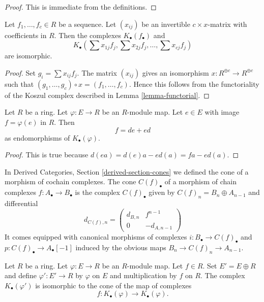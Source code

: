 \begin{proof}
This is immediate from the definitions.
\end{proof}

\begin{lemma}
\label{lemma-change-basis}
Let $f_1, \ldots, f_c \in R$ be a sequence.
Let $(x_{ij})$ be an invertible $c \times x$-matrix with
coefficients in $R$. Then the complexes
$K_\bullet(f_\bullet)$ and
$$
K_\bullet(\sum x_{1j}f_j, \sum x_{2j}f_j, \ldots, \sum x_{cj}f_j)
$$
are isomorphic.
\end{lemma}

\begin{proof}
Set $g_i = \sum x_{ij}f_j$.
The matrix $(x_{ij})$ gives an isomorphism $x : R^{\oplus c} \to R^{\oplus c}$
such that $(g_1, \ldots, g_c) \circ x = (f_1, \ldots, f_c)$.
Hence this follows from the functoriality of the Koszul complex
described in
Lemma \ref{lemma-functorial}.
\end{proof}

\begin{lemma}
\label{lemma-homotopy-koszul-abstract}
Let $R$ be a ring. Let $\varphi : E \to R$ be an $R$-module map.
Let $e \in E$ with image $f = \varphi(e)$ in $R$. Then
$$
f = de + ed
$$
as endomorphisms of $K_\bullet(\varphi)$.
\end{lemma}

\begin{proof}
This is true because $d(ea) = d(e)a - ed(a) = fa - ed(a)$.
\end{proof}

\noindent
In
Derived Categories, Section \ref{derived-section-cones}
we defined the cone of a morphism of cochain complexes.
The cone $C(f)_\bullet$ of a morphism of chain complexes
$f : A_\bullet \to B_\bullet$ is the complex $C(f)_\bullet$ given by
$C(f)_n = B_n \oplus A_{n - 1}$ and differential
\begin{equation}
\label{equation-differential-cone}
d_{C(f), n} =
\left(
\begin{matrix}
d_{B, n} & f^{n - 1} \\
0 & -d_{A, n - 1}
\end{matrix}
\right)
\end{equation}
It comes equipped with canonical morphisms of complexes
$i : B_\bullet \to C(f)_\bullet$ and
$p : C(f)_\bullet \to A_\bullet[-1]$
induced by the obvious maps $B_n \to C(f)_n \to A_{n - 1}$.

\begin{lemma}
\label{lemma-cone-koszul-abstract}
Let $R$ be a ring. Let $\varphi : E \to R$ be an $R$-module map.
Let $f \in R$. Set $E' = E \oplus R$ and define $\varphi' : E' \to R$
by $\varphi$ on $E$ and multiplication by $f$ on $R$.
The complex $K_\bullet(\varphi')$ is isomorphic to the
cone of the map of complexes
$$
f :
K_\bullet(\varphi)
\longrightarrow
K_\bullet(\varphi).
$$
\end{lemma}

